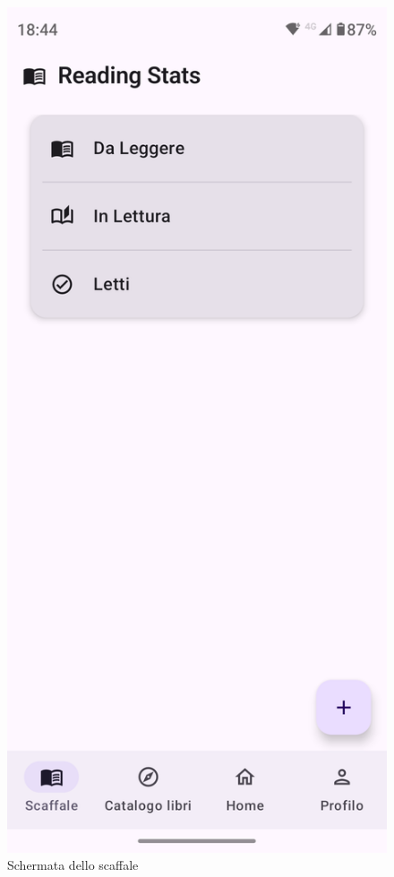 \documentclass{article}
\begin{document}
\begin{figure}[H]
  \centering
  \includegraphics[width=0.6\linewidth]{shelf.png}
  \caption{Schermata dello scaffale}
  \label{fig:sitemap}
\end{figure}
\end{document}
